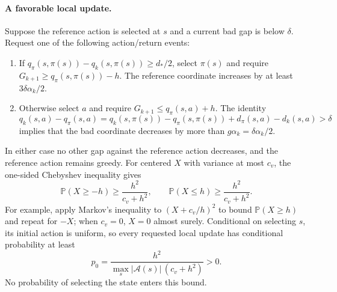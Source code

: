 \paragraph{A favorable local update.}
Suppose the reference action is selected at $s$ and a current
bad gap is below $\delta$. Request one of the following action/return events:
\begin{enumerate}
\item If $q_\pi(s,\pi(s))-q_k(s,\pi(s))\ge d_*/2$, select $\pi(s)$ and require $G_{k+1}\ge q_\pi(s,\pi(s))-h$. The
reference coordinate increases by at least $3\delta\alpha_k/2$.
\item Otherwise select $a$ and require $G_{k+1}\le q_\pi(s,a)+h$. The identity
\[
q_k(s,a)-q_\pi(s,a)=q_k(s,\pi(s))-q_\pi(s,\pi(s))+d_\pi(s,a)-d_k(s,a)>\delta
\]
implies that the bad coordinate decreases by more than $g\alpha_k=\delta\alpha_k/2$.
\end{enumerate}
In either case no other gap against the reference action decreases, and the reference action
remains greedy. For centered $X$ with variance at most $c_v$, the one-sided Chebyshev inequality
gives
\[
\mathbb P(X\ge-h)\ge\frac{h^2}{c_v+h^2},\qquad
\mathbb P(X\le h)\ge\frac{h^2}{c_v+h^2}.
\]
For example, apply Markov's inequality to $(X+c_v/h)^2$ to bound $\mathbb P(X\ge h)$ and repeat for
$-X$; when $c_v=0$, $X=0$ almost surely. Conditional on selecting $s$, its initial action is
uniform, so every requested local update has conditional probability at least
\begin{equation}\label{eq:localprob}
p_0=\frac{h^2}{\max_s|\mathcal A(s)|\,(c_v+h^2)}>0.
\end{equation}
No probability of selecting the state enters this bound.


